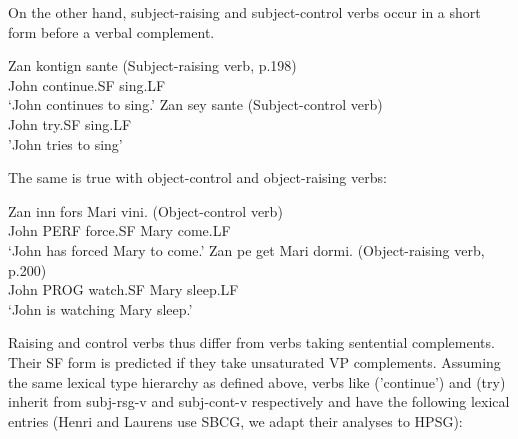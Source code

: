 \documentclass[output=paper]{langsci/langscibook}
\begin{document}
On the other hand, subject-raising and subject-control verbs occur in a short form before a verbal complement.

\begin{exe}
\ex \begin{xlist}
\ex \gll Zan kontign sante (Subject-raising verb, p.198)\\
John continue.SF sing.LF\\
\glt ‘John continues to sing.’
\ex \gll Zan sey sante (Subject-control verb)\\
John try.SF sing.LF\\
\glt 'John tries to sing'
\end{xlist}
\end{exe}

The same is true with object-control and object-raising verbs:
\begin{exe}
\ex \begin{xlist}
\ex \gll Zan inn fors Mari vini. (Object-control verb)\\
John PERF force.SF Mary come.LF\\
\glt ‘John has forced Mary to come.’
\ex \gll Zan pe get Mari dormi. (Object-raising verb, p.200) \\
John PROG watch.SF Mary sleep.LF\\
\glt ‘John is watching Mary sleep.’
\end{xlist}
\end{exe}


Raising  and control verbs thus differ from verbs taking sentential complements. Their SF form is predicted if they take unsaturated VP complements. Assuming the same lexical type hierarchy as defined above, verbs like  ('continue') and  (try) inherit from subj-rsg-v and subj-cont-v respectively and have the following lexical entries (Henri and Laurens use SBCG, we adapt their analyses to HPSG):
\end{document}
